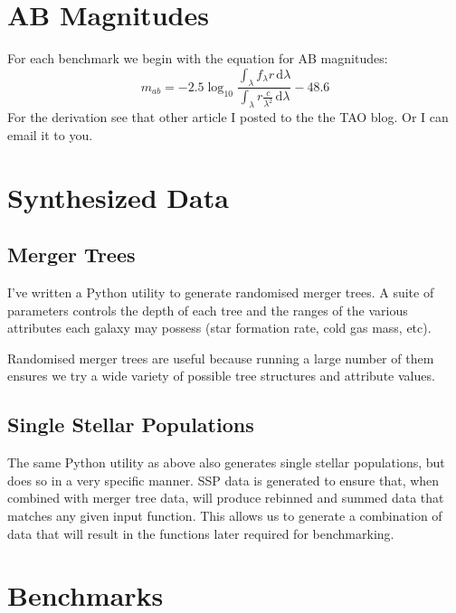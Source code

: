 \documentclass[12pt]{scrartcl}
\newcommand{\dx}[1]{\ensuremath{\,\mathrm{d}#1}}
\begin{document}
\maketitle

\section{AB Magnitudes}

For each benchmark we begin with the equation for AB magnitudes:
\[ m_{ab} = -2.5\log_{10} \frac{{\displaystyle \int_\lambda f_\lambda
    r \dx{\lambda}}}{{\displaystyle \int_\lambda r \frac{c}{\lambda^2}
    \dx{\lambda}}} - 48.6 \]
For the derivation see that other article I posted to the the TAO
blog. Or I can email it to you.

\section{Synthesized Data}

\subsection{Merger Trees}

I've written a Python utility to generate randomised merger trees. A
suite of parameters controls the depth of each tree and the ranges of
the various attributes each galaxy may possess (star formation rate,
cold gas mass, etc).

Randomised merger trees are useful because running a large number of
them ensures we try a wide variety of possible tree structures and
attribute values.

\subsection{Single Stellar Populations}

The same Python utility as above also generates single stellar
populations, but does so in a very specific manner. SSP data is
generated to ensure that, when combined with merger tree data, will
produce rebinned and summed data that matches any given
input function. This allows us to generate a combination of data that
will result in the functions later required for benchmarking.

\section{Benchmarks}
\end{document}
